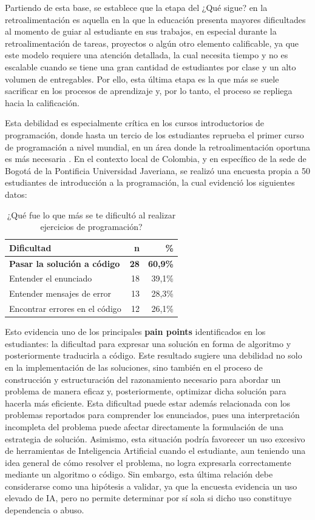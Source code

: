 \documentclass[letterpaper, 10 pt, conference]{ieeeconf}
\begin{document}
Partiendo de esta base, se establece que la etapa del ¿Qué sigue? en la retroalimentación es aquella en la que la educación presenta mayores dificultades al momento de guiar al estudiante en sus trabajos, en especial durante la retroalimentación de tareas, proyectos o algún otro elemento calificable, ya que este modelo requiere una atención detallada, la cual necesita tiempo y no es escalable cuando se tiene una gran cantidad de estudiantes por clase y un alto volumen de entregables. Por ello, esta última etapa es la que más se suele sacrificar en los procesos de aprendizaje y, por lo tanto, el proceso se repliega hacia la calificación. 

Esta debilidad es especialmente crítica en los cursos introductorios de programación, donde hasta un tercio de los estudiantes reprueba el primer curso de programación a nivel mundial, en un área donde la retroalimentación oportuna es más necesaria \cite{24}. En el contexto local de Colombia, y en específico de la sede de Bogotá de la Pontificia Universidad Javeriana, se realizó una encuesta propia a 50 estudiantes de introducción a la programación, la cual evidenció los siguientes datos:

\begin{table}[ht]
	\centering
	\caption{¿Qué fue lo que más se te dificultó al realizar ejercicios de programación?}
	\label{tab:feedback}
	\begin{tabular}{lrr}
		\hline
		\textbf{Dificultad} & \textbf{n} & \textbf{\%} \\
		\hline
		\textbf{Pasar la solución a código} & \textbf{28} & \textbf{60,9\%} \\
		Entender el enunciado & 18 & 39,1\% \\
		Entender mensajes de error & 13 & 28,3\% \\
		Encontrar errores en el código & 12 & 26,1\% \\
		\hline
	\end{tabular}
\end{table}

Esto evidencia uno de los principales \textbf{pain points} identificados en los estudiantes: la dificultad para expresar una solución en forma de algoritmo y posteriormente traducirla a código. Este resultado sugiere una debilidad no solo en la implementación de las soluciones, sino también en el proceso de construcción y estructuración del razonamiento necesario para abordar un problema de manera eficaz y, posteriormente, optimizar dicha solución para hacerla más eficiente. Esta dificultad puede estar además relacionada con los problemas reportados para comprender los enunciados, pues una interpretación incompleta del problema puede afectar directamente la formulación de una estrategia de solución. Asimismo, esta situación podría favorecer un uso excesivo de herramientas de Inteligencia Artificial cuando el estudiante, aun teniendo una idea general de cómo resolver el problema, no logra expresarla correctamente mediante un algoritmo o código. Sin embargo, esta última relación debe considerarse como una hipótesis a validar, ya que la encuesta evidencia un uso elevado de IA, pero no permite determinar por sí sola si dicho uso constituye dependencia o abuso.
\end{document}
